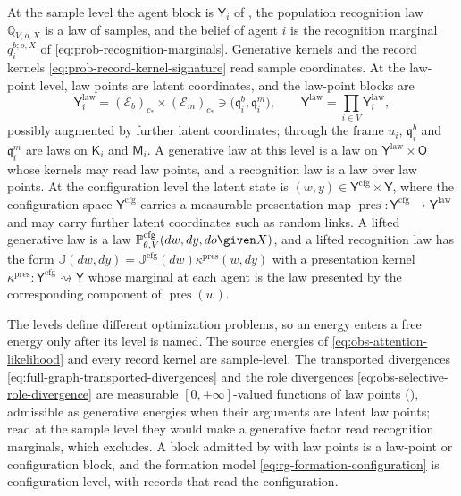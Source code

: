 At the sample level the agent block is $\mathsf Y_i$ of , the
population recognition law $\mathbb Q_{V,o,X}$ is a law of samples, and the belief of agent $i$ is the
recognition marginal $q_i^{b;o,X}$ of \eqref{eq:prob-recognition-marginals}. Generative kernels and the
record kernels \eqref{eq:prob-record-kernel-signature} read sample coordinates. At the law-point level, law
points are latent coordinates, and the law-point blocks are
\begin{equation}
\mathsf Y^{\mathrm{law}}_i=(\mathcal E_b)_{c_*}\times(\mathcal E_m)_{c_*}\ni\bigl(\mathfrak q_i^b,\mathfrak q_i^m\bigr),
\qquad
\mathsf Y^{\mathrm{law}}=\prod_{i\in V}\mathsf Y^{\mathrm{law}}_i,
\label{eq:prob-law-point-space}
\end{equation}
possibly augmented by further latent coordinates; through the frame $u_i$, $\mathfrak q_i^b$ and
$\mathfrak q_i^m$ are laws on $\mathsf K_i$ and $\mathsf M_i$. A generative law at this level is a law on
$\mathsf Y^{\mathrm{law}}\times\mathsf O$ whose kernels may read law points, and a recognition law is a law
over law points. At the configuration level the latent state is
$(w,y)\in\mathsf Y^{\mathrm{cfg}}\times\mathsf Y$, where the configuration space $\mathsf Y^{\mathrm{cfg}}$
carries a measurable presentation map
$\operatorname{pres}:\mathsf Y^{\mathrm{cfg}}\to\mathsf Y^{\mathrm{law}}$ and may carry further latent
coordinates such as random links. A lifted generative law is a law $\mathbb P^{\mathrm{cfg}}_{\theta,V}(dw,dy,do\given X)$, and a lifted
recognition law has the form $\mathbb J(dw,dy)=\mathbb J^{\mathrm{cfg}}(dw)\kappa^{\mathrm{pres}}(w,dy)$ with a
presentation kernel $\kappa^{\mathrm{pres}}:\mathsf Y^{\mathrm{cfg}}\rightsquigarrow\mathsf Y$ whose marginal
at each agent is the law presented by the corresponding component of $\operatorname{pres}(w)$.

The levels define different optimization problems, so an energy enters a free energy only after its level
is named. The source energies of \eqref{eq:obs-attention-likelihood} and every record kernel are
sample-level. The transported divergences \eqref{eq:full-graph-transported-divergences} and the role
divergences \eqref{eq:obs-selective-role-divergence} are measurable $[0,+\infty]$-valued functions of law
points (), admissible as generative energies when their arguments
are latent law points; read at the sample level they would make a generative factor read recognition
marginals, which  excludes. A block admitted by  with
law points is a law-point or configuration block, and the formation model
\eqref{eq:rg-formation-configuration} is configuration-level, with records that read the configuration.


